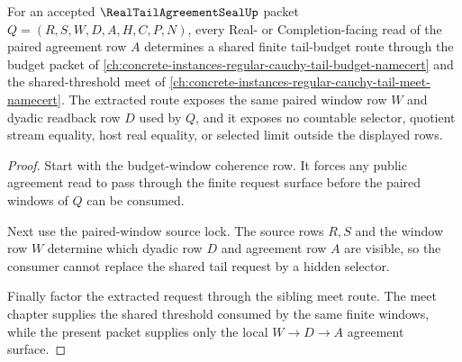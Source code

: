 \begin{theorem}
\label{thm:real-tail-agreement-seal-shared-tail-budget-extraction}
For an accepted $\RealTailAgreementSealUp$ packet $Q=(R,S,W,D,A,H,C,P,N)$, every Real- or Completion-facing read of the paired agreement row $A$ determines a shared finite tail-budget route through the budget packet of \autoref{ch:concrete-instances-regular-cauchy-tail-budget-namecert} and the shared-threshold meet of \autoref{ch:concrete-instances-regular-cauchy-tail-meet-namecert}. The extracted route exposes the same paired window row $W$ and dyadic readback row $D$ used by $Q$, and it exposes no countable selector, quotient stream equality, host real equality, or selected limit outside the displayed rows.
\end{theorem}
\begin{proof}
Start with the budget-window coherence row. It forces any public agreement read to pass through the finite request surface before the paired windows of $Q$ can be consumed.

Next use the paired-window source lock. The source rows $R,S$ and the window row $W$ determine which dyadic row $D$ and agreement row $A$ are visible, so the consumer cannot replace the shared tail request by a hidden selector.

Finally factor the extracted request through the sibling meet route. The meet chapter supplies the shared threshold consumed by the same finite windows, while the present packet supplies only the local $W \to D \to A$ agreement surface.
\end{proof}

